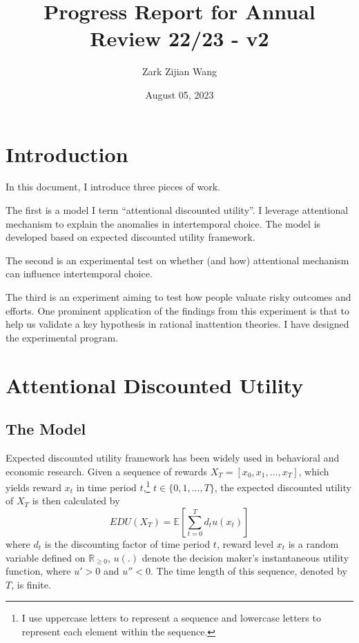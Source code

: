 \documentclass[
  12pt,
]{article}
\title{Progress Report for Annual Review 22/23 - v2}
\author{Zark Zijian Wang}
\date{August 05, 2023}
\begin{document}
\maketitle

\hypertarget{introduction}{%
\section{Introduction}\label{introduction}}

In this document, I introduce three pieces of work.

The first is a model I term ``attentional discounted utility''. I
leverage attentional mechanism to explain the anomalies in intertemporal
choice. The model is developed based on expected discounted utility
framework.

The second is an experimental test on whether (and how) attentional
mechanism can influence intertemporal choice.

The third is an experiment aiming to test how people valuate risky
outcomes and efforts. One prominent application of the findings from
this experiment is that to help us validate a key hypothesis in rational
inattention theories. I have designed the experimental program.

\hypertarget{attentional-discounted-utility}{%
\section{Attentional Discounted
Utility}\label{attentional-discounted-utility}}

\hypertarget{the-model}{%
\subsection{The Model}\label{the-model}}

Expected discounted utility framework has been widely used in behavioral
and economic research. Given a sequence of rewards
\(X_T=[x_0,x_1,...,x_T]\), which yields reward \(x_t\) in time period
\(t\),\footnote{I use uppercase letters to represent a sequence and
  lowercase letters to represent each element within the sequence.}
\(t \in \{0,1,...,T\}\), the expected discounted utility of \(X_T\) is
then calculated by\[
EDU(X_T)= \mathbb{E}\left[\sum_{t=0}^T d_t u(x_t)\right]
\]where \(d_t\) is the discounting factor of time period \(t\), reward
level \(x_t\) is a random variable defined on \(\mathbb{R}_{\geq 0}\),
\(u(.)\) denote the decision maker's instantaneous utility function,
where \(u'>0\) and \(u''<0\). The time length of this sequence, denoted
by \(T\), is finite.
\end{document}
